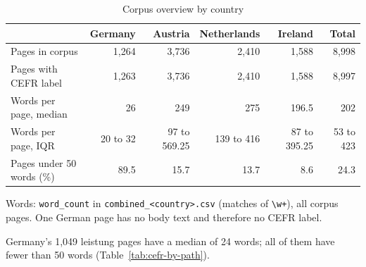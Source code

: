 \begin{table}[htbp]
\centering
\begin{threeparttable}
\caption{Corpus overview by country}
\label{tab:corpus-overview}
\begin{tabular}{lrrrrr}
\hline
 & Germany & Austria & Netherlands & Ireland & Total \\
\hline
Pages in corpus & 1,264 & 3,736 & 2,410 & 1,588 & 8,998 \\
Pages with CEFR label & 1,263 & 3,736 & 2,410 & 1,588 & 8,997 \\
\hline
Words per page, median & 26 & 249 & 275 & 196.5 & 202 \\
Words per page, IQR & 20 to 32 & 97 to 569.25 & 139 to 416 & 87 to 395.25 & 53 to 423 \\
Pages under 50 words (\%) & 89.5 & 15.7 & 13.7 & 8.6 & 24.3 \\
\hline
\end{tabular}
\begin{tablenotes}
\footnotesize
\item Words: \texttt{word\_count} in \texttt{combined\_<country>.csv} (matches of \texttt{\textbackslash w+}), all corpus pages. One German page has no body text and therefore no CEFR label.
\item Germany's 1,049 leistung pages have a median of 24 words; all of them have fewer than 50 words (Table~\ref{tab:cefr-by-path}).
\end{tablenotes}
\end{threeparttable}
\end{table}
